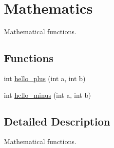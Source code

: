 \hypertarget{group__math}{\section{Mathematics}
\label{group__math}
}


Mathematical functions.  


\subsection*{Functions}
\begin{DoxyCompactItemize}
\item 
int \hyperlink{group__math_gaa533a987e27f7c119afea181a692f902}{hello\-\_\-plus} (int a, int b)
\item 
int \hyperlink{group__math_ga7e9a23b3d6ed49af881e5f4ac4977a6a}{hello\-\_\-minus} (int a, int b)
\end{DoxyCompactItemize}


\subsection{Detailed Description}
Mathematical functions. 

